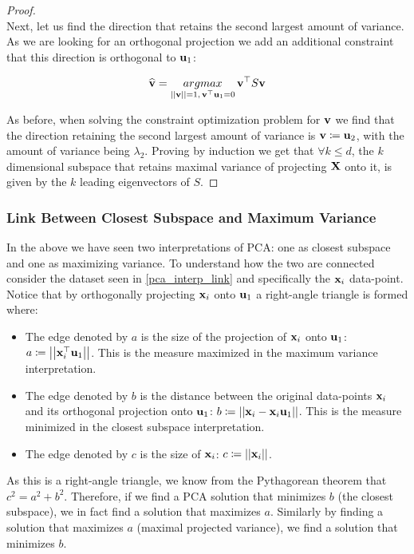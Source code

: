 \begin{proof}
~\\Next, let us find the direction that retains the second largest amount of variance. As we are looking for an orthogonal projection we add an additional constraint that this direction is orthogonal to $\mathbf{u}_1$:

$$ \widehat{\mathbf{v}} = \underset{\left|\left| \mathbf{v}\right|\right|=1,\, \mathbf{v}^\top \mathbf{u}_1 = 0}{argmax}\, \mathbf{v}^\top S\mathbf{v} $$

As before, when solving the constraint optimization problem for $\mathbf{v}$ we find that the direction retaining the second largest amount of variance is $\mathbf{v}\coloneqq \mathbf{u}_2$, with the amount of variance being $\lambda_2$. Proving by induction we get that $\forall k\leq d$, the $k$ dimensional subspace that retains maximal variance of projecting $\mathbf{X}$ onto it, is given by the $k$ leading eigenvectors of $S$.
\end{proof}


\subsubsection{Link Between Closest Subspace and Maximum Variance}
In the above we have seen two interpretations of PCA: one as closest subspace and one as maximizing variance. To understand how the two are connected consider the dataset seen in \autoref{pca_interp_link} and specifically the $\mathbf{x}_i$ data-point. Notice that by orthogonally projecting $\mathbf{x}_i$ onto $\mathbf{u}_1$ a right-angle triangle is formed where:
\begin{itemize}
	\item The edge denoted by $a$ is the size of the projection of $\mathbf{x}_i$ onto $\mathbf{u}_1$: $a\coloneqq \left|\left| \mathbf{x}_i^\top \mathbf{u}_1\right|\right|$. This is the measure maximized in the maximum variance interpretation.
	\item The edge denoted by $b$ is the distance between the original data-points $\mathbf{x}_i$ and its orthogonal projection onto $\mathbf{u}_1$: $b\coloneqq \left|\left| \mathbf{x}_i - \mathbf{x}_i \mathbf{u}_1\right|\right|$. This is the measure minimized in the closest subspace interpretation.
	\item The edge denoted by $c$ is the size of $\mathbf{x}_i$: $c\coloneqq \left|\left| \mathbf{x}_i\right|\right|$.
\end{itemize}

As this is a right-angle triangle, we know from the Pythagorean theorem that $c^2=a^2+b^2$. Therefore, if we find a PCA solution that minimizes $b$ (the closest subspace), we in fact find a solution that maximizes $a$. Similarly by finding a solution that maximizes $a$ (maximal projected variance), we find a solution that minimizes $b$.

